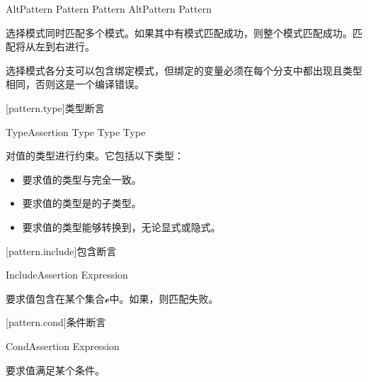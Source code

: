 \begin{bnf}{AltPattern}
    Pattern \terminal{|} Pattern \br
    AltPattern \terminal{|} Pattern
\end{bnf}

\pnum
选择模式同时匹配多个模式。如果其中有模式匹配成功，则整个模式匹配成功。匹配将从左到右进行。

\pnum
选择模式各分支可以包含绑定模式，但绑定的变量必须在每个分支中都出现且类型相同，否则这是一个编译错误。

[pattern.type]{类型断言}

\begin{bnf}{TypeAssertion}
     Type \br
    \terminal{:} Type \br
     Type
\end{bnf}

\pnum
{}对值的类型进行约束。它包括以下类型：

\begin{itemize}
    \item {}要求值的类型与完全一致。
    \item {}要求值的类型是的子类型。
    \item {}要求值的类型能够转换到，无论显式或隐式。
    \end{itemize}

[pattern.include]{包含断言}

\begin{bnf}{IncludeAssertion}
     Expression
\end{bnf}

\pnum
{}要求值包含在某个集合$\mathcal{e}$中。如果，则匹配失败。

[pattern.cond]{条件断言}

\begin{bnf}{CondAssertion}
     Expression
\end{bnf}

\pnum
{}要求值满足某个条件。
